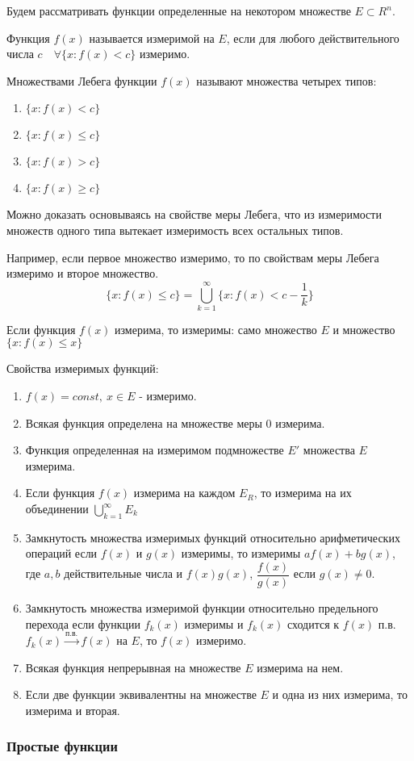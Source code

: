 \documentclass[14pt,a4paper]{extarticle}
\theoremstyle{definition}
\theoremstyle{remark}
\renewcommand{\[}{\begin{dmath*}[compact]}
\renewcommand{\]}{\end{dmath*}}
\newcommand{\be}{\begin{enumerate}}
\newcommand{\ee}{\end{enumerate}}
\newcommand{\sep}{ , \ \allowbreak }
\newcommand\f[2]{\dfrac{#1}{#2}}
\begin{document}
Будем рассматривать функции определенные на некотором множестве $E \subset R^n$.

Функция $f(x)$ называется измеримой на $E$, если для любого действительного числа $c \quad \forall \{x: f(x) < c \}$ измеримо.

Множествами Лебега функции $f(x)$ называют множества четырех типов:

\be
  \item $\{x: f(x) < c\}$
  \item $\{x: f(x) \leq c\}$
  \item $\{x: f(x) > c\}$
  \item $\{x: f(x) \geq c\}$
\ee

Можно доказать основываясь на свойстве меры Лебега, что из измеримости множеств одного типа вытекает измеримость всех остальных типов.

Например, если первое множество измеримо, то по свойствам меры Лебега измеримо и второе множество.
\[\{x: f(x) \leq c\}= \bigcup_{k=1}^\infty\{x:f(x) < c - \f{1}{k}\}\]

Если функция $f(x)$ измерима, то измеримы: само множество $E$ и множество $\{x:f(x)\leq x\}$

Свойства измеримых функций:

\be
  \item $f(x)=const \sep x \in E$ - измеримо.
  \item Всякая функция определена на множестве меры 0 измерима.
  \item Функция определенная на измеримом подмножестве $E'$ множества $E$ измерима.
  \item Если функция $f(x)$ измерима на каждом $E_R$, то измерима на их объединении $\bigcup _ {k=1}^\infty E_k$
  \item Замкнутость множества измеримых функций относительно арифметических операций если $f(x)$ и $g(x)$ измеримы, то измеримы $af(x)+ bg(x)$, где $a,b$ действительные числа и $f(x)g(x)$, $\f{f(x)}{g(x)}$ если $g(x) \neq 0$.
  \item Замкнутость множества измеримой функции относительно предельного перехода если функции $f_k(x)$ измеримы и $f_k(x)$ сходится к $f(x)$ п.в. $f_k(x) \xrightarrow{п.в.} f(x)$ на $E$, то $f(x)$ измеримо.
  \item Всякая функция непрерывная на множестве $E$ измерима на нем.
  \item Если две функции эквивалентны на множестве $E$ и одна из них измерима, то измерима и вторая.
\ee

\subsubsection{Простые функции}
\end{document}
